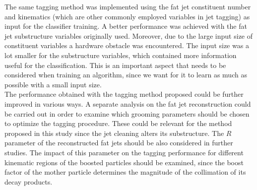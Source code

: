 \documentclass[main]{subfiles} %
\begin{document}
The same tagging method was implemented using the fat jet constituent number and kinematics (which are other commonly employed variables in jet tagging) as input for the classifier training. A better performance was achieved with the fat jet substructure variables originally used. Moreover, due to the large input size of constituent variables a hardware obstacle was encountered. The input size was a lot smaller for the substructure variables, which contained more information useful for the classification. This is an important aspect that needs to be considered when training an algorithm, since we want for it to learn as much as possible with a small input size. \\  

The performance obtained with the tagging method proposed could be further improved in various ways. A separate analysis on the fat jet reconstruction could be carried out in order to examine which grooming parameters should be chosen to optimize the tagging procedure. These could be relevant for the method proposed in this study since the jet cleaning alters its substructure. The $R$ parameter of the reconstructed fat jets should be also considered in further studies. The impact of this parameter on the tagging performance for different kinematic regions of the boosted particles should be examined, since the boost factor of the mother particle determines the magnitude of the collimation of its decay products. 

























\biblio
\end{document}
